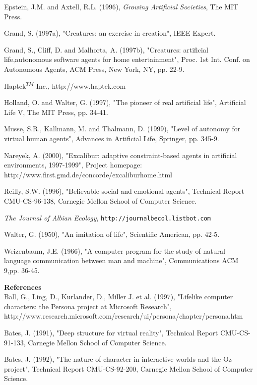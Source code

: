 \documentclass[11pt,twoside,a4paper]{article}
\begin{document}
Epstein, J.M. and Axtell, R.L. (1996), \emph{Growing Artificial Societies}, The MIT Press.

Grand, S. (1997a), "Creatures: an exercise in creation", IEEE Expert.

Grand, S., Cliff, D. and Malhorta, A. (1997b), "Creatures: artificial life,autonomous software agents for home entertainment", Proc. 1st Int. Conf. on Autonomous Agents, ACM Press, New York, NY, pp. 22-9.

Haptek$^{TM}$ Inc., http://www.haptek.com

Holland, O. and Walter, G. (1997), "The pioneer of real artificial life", Artificial Life V, The MIT Press, pp. 34-41.

Musse, S.R., Kallmann, M. and Thalmann, D. (1999), "Level of autonomy for virtual human agents", Advances in Artificial Life, Springer, pp. 345-9.

Nareyek, A. (2000), "Excalibur: adaptive constraint-based agents in artificial environments, 1997-1999", Project homepage: http://www.first.gmd.de/concorde/excaliburhome.html

Reilly, S.W. (1996), "Believable social and emotional agents", Technical Report CMU-CS-96-138, Carnegie Mellon School of Computer Science.

\emph{The Journal of Albian Ecology}, \texttt{http://journalbecol.listbot.com}

Walter, G. (1950), "An imitation of life", Scientific American, pp. 42-5.

Weizenbaum, J.E. (1966), "A computer program for the study of natural language communication between man and machine", Communications ACM 9,pp. 36-45.

\textbf{References}~\\

Ball, G., Ling, D., Kurlander, D., Miller J. et al. (1997), "Lifelike computer characters: the Persona project at Microsoft Research", http://www.research.microsoft.com/research/ui/persona/chapter/persona.htm

Bates, J. (1991), "Deep structure for virtual reality", Technical Report CMU-CS-91-133, Carnegie Mellon School of Computer Science.

Bates, J. (1992), "The nature of character in interactive worlds and the Oz project", Technical Report CMU-CS-92-200, Carnegie Mellon School of Computer Science.
\end{document}
